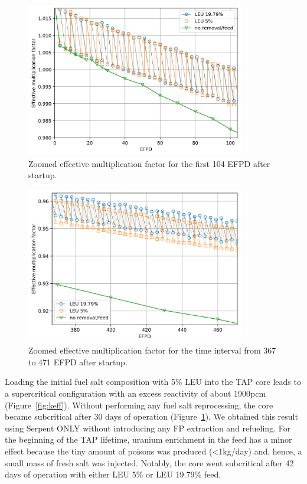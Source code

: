 \documentclass[12pt]{article} %
\begin{document}
\begin{figure}[htp!] %
  \centering
		  \includegraphics[width=0.85\textwidth]{keff_zoomed_1.png}
	  \vspace{-0.25in}
  \caption{Zoomed effective multiplication factor for the first 104 EFPD 
  after startup.}
  \label{fig:keff-zoomed}
\end{figure}
\begin{figure}[htp!] %
  \centering
		  \includegraphics[width=0.85\textwidth]{keff_zoomed_2.png}
	 \vspace{-0.25in}
  \caption{Zoomed effective multiplication factor for the time interval 
  from 367 to 471 EFPD after startup.}
  \label{fig:keff-zoomed-2}
\end{figure}

Loading the initial fuel salt composition with 5\% \gls{LEU} into the 
\gls{TAP} core leads to a supercritical configuration with an excess 
reactivity of about 1900pcm (Figure~\ref{fig:keff}). Without performing any 
fuel salt reprocessing, the core became subcritical after 30 days of operation 
(Figure~\ref{fig:keff-zoomed}). 
We obtained this result using Serpent ONLY without introducing any \gls{FP} 
extraction and refueling. For the beginning of the \gls{TAP} lifetime, uranium 
enrichment in the feed has a minor effect because the tiny amount of poisons 
was produced (<1kg/day) and, hence, a small mass of fresh salt was injected. 
Notably, the core went subcritical after 42 days of operation with either  
\gls{LEU} 5\% or \gls{LEU} 19.79\% feed.
\end{document}
